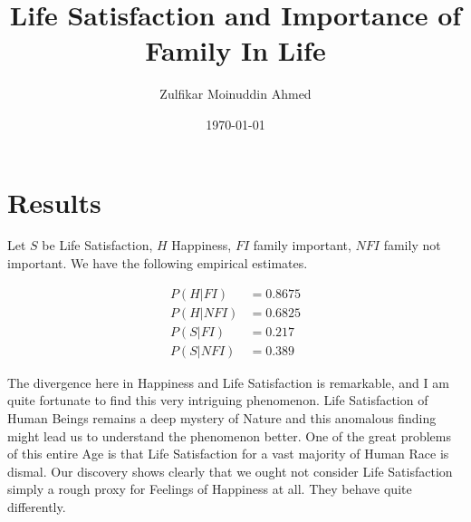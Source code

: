\documentclass{amsart}
\title{Life Satisfaction and Importance of Family In Life}
\author{Zulfikar Moinuddin Ahmed}
\date{\today}
\begin{document}
\maketitle

\section{Results}

Let $S$ be Life Satisfaction, $H$ Happiness, $FI$ family important, $NFI$ family not important.  We have the following empirical estimates.

\begin{eqnarray*}
P(H|FI) &= 0.8675\\
P(H|NFI) &= 0.6825\\
P(S|FI) &= 0.217\\
P(S|NFI) &= 0.389
\end{eqnarray*}

The divergence here in Happiness and Life Satisfaction is remarkable, and I am quite fortunate to find this very intriguing phenomenon.
Life Satisfaction of Human Beings remains a deep mystery of Nature and this anomalous finding might lead us to understand the phenomenon better.  One of the great problems of this entire Age is that Life Satisfaction for a vast majority of Human Race is dismal.  Our discovery shows clearly that we ought not consider Life Satisfaction simply a rough proxy for Feelings of Happiness at all.  They behave quite differently.
 
\end{document}
